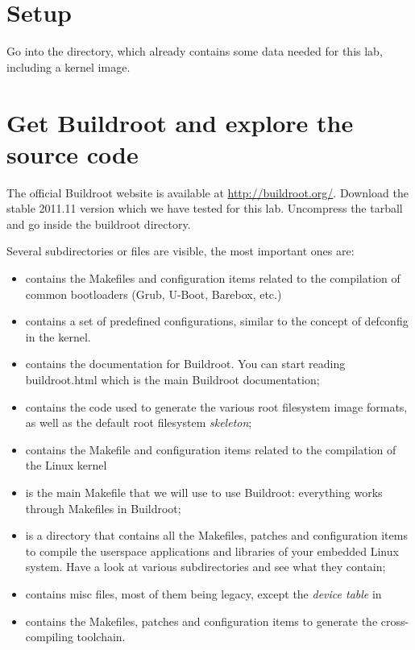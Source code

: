 
\section{Setup}

Go into the  directory,
which already contains some data needed for this lab, including a
kernel image.

\section{Get Buildroot and explore the source code}

The official Buildroot website is available at
\url{http://buildroot.org/}. Download the stable 2011.11 version which
we have tested for this lab. Uncompress the tarball and go inside the
buildroot directory.

Several subdirectories or files are visible, the most important ones
are:

\begin{itemize}
\item {} contains the Makefiles and configuration items
  related to the compilation of common bootloaders (Grub, U-Boot,
  Barebox, etc.)
\item {} contains a set of predefined configurations,
  similar to the concept of defconfig in the kernel.
\item {} contains the documentation for Buildroot. You can
  start reading buildroot.html which is the main Buildroot
  documentation;
\item {} contains the code used to generate the various root
  filesystem image formats, as well as the default root filesystem
  {\em skeleton};
\item {} contains the Makefile and configuration items
  related to the compilation of the Linux kernel
\item {} is the main Makefile that we will use to use
  Buildroot: everything works through Makefiles in Buildroot;
\item {} is a directory that contains all the Makefiles,
  patches and configuration items to compile the userspace
  applications and libraries of your embedded Linux system. Have a
  look at various subdirectories and see what they contain;
\item {} contains misc files, most of them being legacy,
  except the {\em device table} in 
\item {} contains the Makefiles, patches and
  configuration items to generate the cross-compiling toolchain.
\end{itemize}

